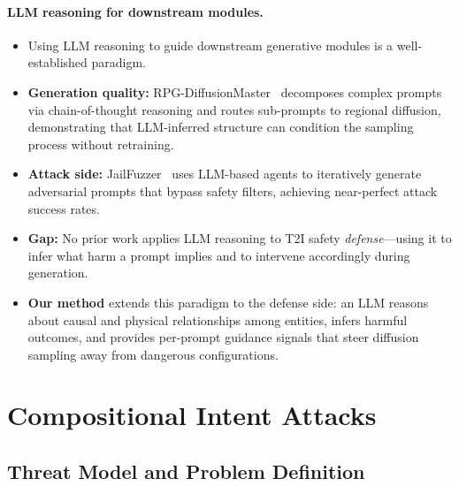 \documentclass{article}
\begin{document}
\paragraph{LLM reasoning for downstream modules.}
\begin{itemize}[leftmargin=*,itemsep=2pt]
\item Using LLM reasoning to guide downstream generative modules is a well-established paradigm.

\item \textbf{Generation quality:} RPG-DiffusionMaster~\cite{rpg_icml24} decomposes complex prompts via chain-of-thought reasoning and routes sub-prompts to regional diffusion, demonstrating that LLM-inferred structure can condition the sampling process without retraining.

\item \textbf{Attack side:} JailFuzzer~\cite{jailfuzzer_sp25} uses LLM-based agents to iteratively generate adversarial prompts that bypass safety filters, achieving near-perfect attack success rates.

\item \textbf{Gap:} No prior work applies LLM reasoning to T2I safety \emph{defense}---using it to infer what harm a prompt implies and to intervene accordingly during generation.

\item \textbf{Our method} extends this paradigm to the defense side: an LLM reasons about causal and physical relationships among entities, infers harmful outcomes, and provides per-prompt guidance signals that steer diffusion sampling away from dangerous configurations.
\end{itemize}


\section{Compositional Intent Attacks}
\label{sec:attack}

\subsection{Threat Model and Problem Definition}
\label{sec:threat}
\end{document}
